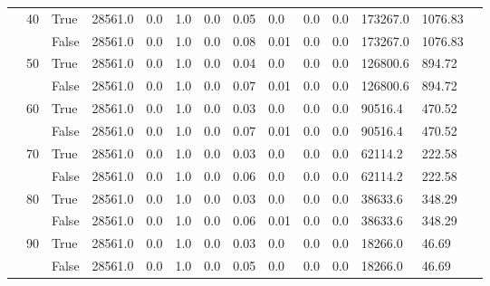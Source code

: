 \begin{landscape}
\begin{small}
\begin{longtable}[c]{@{}lll|ll|ll|ll|ll|lll@{}}
   & 40 & True  & 28561.0         & 0.0            & 1.0           & 0.0           & 0.05          & 0.0           & 0.0           & 0.0           & 173267.0      & 1076.83     &  \\
   &    & False & 28561.0         & 0.0            & 1.0           & 0.0           & 0.08          & 0.01          & 0.0           & 0.0           & 173267.0      & 1076.83     &  \\
   & 50 & True  & 28561.0         & 0.0            & 1.0           & 0.0           & 0.04          & 0.0           & 0.0           & 0.0           & 126800.6      & 894.72      &  \\
   &    & False & 28561.0         & 0.0            & 1.0           & 0.0           & 0.07          & 0.01          & 0.0           & 0.0           & 126800.6      & 894.72      &  \\
   & 60 & True  & 28561.0         & 0.0            & 1.0           & 0.0           & 0.03          & 0.0           & 0.0           & 0.0           & 90516.4       & 470.52      &  \\
   &    & False & 28561.0         & 0.0            & 1.0           & 0.0           & 0.07          & 0.01          & 0.0           & 0.0           & 90516.4       & 470.52      &  \\
   & 70 & True  & 28561.0         & 0.0            & 1.0           & 0.0           & 0.03          & 0.0           & 0.0           & 0.0           & 62114.2       & 222.58      &  \\
   &    & False & 28561.0         & 0.0            & 1.0           & 0.0           & 0.06          & 0.0           & 0.0           & 0.0           & 62114.2       & 222.58      &  \\
   & 80 & True  & 28561.0         & 0.0            & 1.0           & 0.0           & 0.03          & 0.0           & 0.0           & 0.0           & 38633.6       & 348.29      &  \\
   &    & False & 28561.0         & 0.0            & 1.0           & 0.0           & 0.06          & 0.01          & 0.0           & 0.0           & 38633.6       & 348.29      &  \\
   & 90 & True  & 28561.0         & 0.0            & 1.0           & 0.0           & 0.03          & 0.0           & 0.0           & 0.0           & 18266.0       & 46.69       &  \\
   &    & False & 28561.0         & 0.0            & 1.0           & 0.0           & 0.05          & 0.0           & 0.0           & 0.0           & 18266.0       & 46.69       &  \\

\end{longtable}
\end{small}
\end{landscape}

